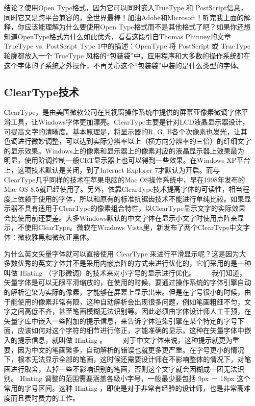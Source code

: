 结论？使用Open Type格式，因为它可以同时嵌入TrueType 和 PostScript信息，同时它又是跨平台兼容的。全世界最棒！加油Adobe和Microsoft！听完我上面的解释，你应该能理解为什么要使用Open Type格式而不是其他格式了吧？如果你还想知道OpenType格式为什么如此优秀，看看这段引自Thomas Phinney的文章TrueType vs. PostScript Type 1中的描述：OpenType 将 PostScript 或 TrueType 轮廓都放入一个 TrueType 风格的“包装袋”中。应用程序和大多数的操作系统都在这个字体的子系统之外操作，不再关心这个“包装袋”中装的是什么类型的字体。

\subsection{ClearType技术}
ClearType，是由美国微软公司在其视窗操作系统中提供的屏幕亚像素微调字体平滑工具，让Windows字体更加漂亮。ClearType主要是针对LCD液晶显示器设计，可提高文字的清晰度。基本原理是，将显示器的R, G, B各个次像素也发光，让其色调进行微妙调整，可以达到实际分辨率以上（横方向分辨率的三倍）的纤细文字的显示效果。Windows上的像素和显示器上的像素对应的液晶显示器上效果最为明显，使用阶调控制一般CRT显示器上也可以得到一些效果。在Windows XP平台上，这项技术默认是关闭，到了Internet Explorer 7才默认为开启。而与ClearType几乎同样的技术在苹果电脑的Mac OS操作系统中，早在1998年发布的Mac OS 8.5就已经使用了。另外，依靠ClearType技术提高字体的可读性，相当程度上依赖于使用的字体，所以和原有的标准抗锯齿技术不能进行单纯比较。如果显示器不具有适用于ClearType的像素组合特性，以ClearType显示文字的实际效果会比使用前还要差。大多Windows默认的中文字体在显示小文字时使用点阵来显示，不使用ClearType。微软在Windows Vista里，新发布了两个ClearType中文字体：微软雅黑和微软正黑体。

为什么英文矢量字体就可以直接使用 ClearType 来进行平滑显示呢？这是因为大多数优秀的英文字体并不是采用内嵌点阵的方式来进行优化的，它们采用的是一种叫做 Hinting （字形微调）的技术来对小字号的显示进行优化。
　　我们知道，矢量字体是可以无限平滑缩放的，在使用的时候，要通过操作系统的字体引擎自动的解析渲染为实际的像素，才能够在屏幕上显示出来。但是在字号很小的时候，由于能使用的像素非常有限，这种自动解析会出现很多问题，例如笔画粗细不匀，文字之间高低不齐，甚至笔画模糊无法识别等。因此必须由字体设计师人工干预，在矢量字库中嵌入一些附加的提示信息，来告诉字体渲染引擎在某个特定的字号下面，应该如何对这个字符的细节进行修正，才能准确的显示。这种在矢量字体中嵌入的提示信息，就叫做 Hinting 。
　　对于中文字体来说，这种提示就更为重要，因为中文的笔画繁多，自动解析的错误也就更多更严重。在字号更小的情况下，根本无法显示全部的笔画，这时候还需要设计师在不影响整体的情况下，对笔画进行取舍，去掉一些不影响识别的笔画，否则这个文字就会因糊成一团无法识别。 Hinting 调整的范围需要涵盖各级小字号，一般最少要包括 9px － 18px 这个常用的字号区间。这种 Hinting ，即使是对于非常有经验的设计师，也是非常高难度而且费时费力的工作。

